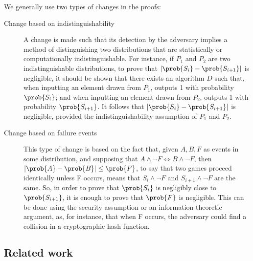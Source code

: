 We generally use two types of changes in the proofs:
\begin{description}
\item[Change based on indistinguishability] A change is made such that its detection by the adversary implies a method of distinguishing two
  distributions that are statistically or computationally indistinguishable. For
  instance, if $P_{1}$ and $P_{2}$ are two indistinguishable distributions,
  to prove that $|\prob{S_{i}} - \prob{S_{i+1}}|$ is negligible, it should be shown
  that there exists an algorithm $D$ such that, when inputting an
  element drawn from $P_{1}$, outputs 1 with probability $\prob{S_{i}}$; and
  when inputting an element drawn from $P_{2}$, outputs 1 with
  probability $\prob{S_{i+1}}$. It follows that
  $|\prob{S_{i}} - \prob{S_{i+1}}|$ is negligible, provided the
  indistinguishability assumption of $P_{1}$ and $P_{2}$.
\item[Change based on failure events] This type of change is based on the fact
  that, given $A,B,F$ as events in some distribution, and supposing that
  $A \wedge \neg F \iff B \wedge \neg F$, then
  $|\prob{A} - \prob{B}| \leq \prob{F}$, to say that two games proceed
  identically unless F occurs, means that $S_{i} \wedge \neg F$ and
  $S_{i+1} \wedge \neg F$ are the same. So, in order to prove that $\prob{S_{i}}$ is
  negligibly close to $\prob{S_{i+1}}$, it is enough to prove that $\prob{F}$ is
  negligible. This can be done using the security assumption or an
  information-theoretic argument, as, for instance, that when F occurs, the adversary
  could find a collision in a cryptographic hash function.
\end{description}

\subsection{Related work}
\label{sec:proofRelatedWork}

